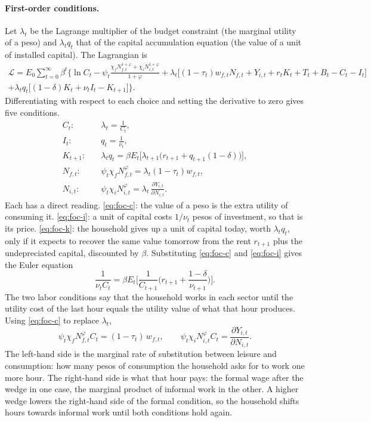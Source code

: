 \paragraph{First-order conditions.} Let $\lambda_t$ be the Lagrange multiplier of the budget constraint (the marginal utility of a peso) and $\lambda_tq_t$ that of the capital accumulation equation (the value of a unit of installed capital). The Lagrangian is
\begin{multline}
\mathcal{L} = E_0\sum_{t=0}^{\infty}\beta^t\Big\{\ln C_t - \psi_t\frac{\chi_fN_{f,t}^{1+\varphi}+\chi_iN_{i,t}^{1+\varphi}}{1+\varphi}
+ \lambda_t\big[(1-\tau_t)w_{f,t}N_{f,t} + Y_{i,t} + r_tK_t + T_t + B_t - C_t - I_t\big] \\
+ \lambda_tq_t\big[(1-\delta)K_t + \nu_tI_t - K_{t+1}\big]\Big\}.
\end{multline}
Differentiating with respect to each choice and setting the derivative to zero gives five conditions.
\begin{align}
C_t:&\quad \lambda_t = \frac{1}{C_t}, \label{eq:foc-c}\\
I_t:&\quad q_t = \frac{1}{\nu_t}, \label{eq:foc-i}\\
K_{t+1}:&\quad \lambda_tq_t = \beta E_t\big[\lambda_{t+1}\big(r_{t+1} + q_{t+1}(1-\delta)\big)\big], \label{eq:foc-k}\\
N_{f,t}:&\quad \psi_t\chi_fN_{f,t}^{\varphi} = \lambda_t(1-\tau_t)w_{f,t}, \label{eq:foc-nf}\\
N_{i,t}:&\quad \psi_t\chi_iN_{i,t}^{\varphi} = \lambda_t\,\frac{\partial Y_{i,t}}{\partial N_{i,t}} . \label{eq:foc-ni}
\end{align}
Each has a direct reading. \eqref{eq:foc-c}: the value of a peso is the extra utility of consuming it. \eqref{eq:foc-i}: a unit of capital costs $1/\nu_t$ pesos of investment, so that is its price. \eqref{eq:foc-k}: the household gives up a unit of capital today, worth $\lambda_tq_t$, only if it expects to recover the same value tomorrow from the rent $r_{t+1}$ plus the undepreciated capital, discounted by $\beta$. Substituting \eqref{eq:foc-c} and \eqref{eq:foc-i} gives the Euler equation
\begin{equation}
\frac{1}{\nu_t C_t} = \beta E_t\Big[\frac{1}{C_{t+1}}\Big(r_{t+1} + \frac{1-\delta}{\nu_{t+1}}\Big)\Big].
\label{eq:euler}
\end{equation}
The two labor conditions say that the household works in each sector until the utility cost of the last hour equals the utility value of what that hour produces. Using \eqref{eq:foc-c} to replace $\lambda_t$,
\begin{equation}
\psi_t\chi_f N_{f,t}^{\varphi} C_t = (1-\tau_t)\,w_{f,t}, \qquad \psi_t\chi_i N_{i,t}^{\varphi} C_t = \frac{\partial Y_{i,t}}{\partial N_{i,t}} .
\label{eq:foc-labor}
\end{equation}
The left-hand side is the marginal rate of substitution between leisure and consumption: how many pesos of consumption the household asks for to work one more hour. The right-hand side is what that hour pays: the formal wage after the wedge in one case, the marginal product of informal work in the other. A higher wedge lowers the right-hand side of the formal condition, so the household shifts hours towards informal work until both conditions hold again.

